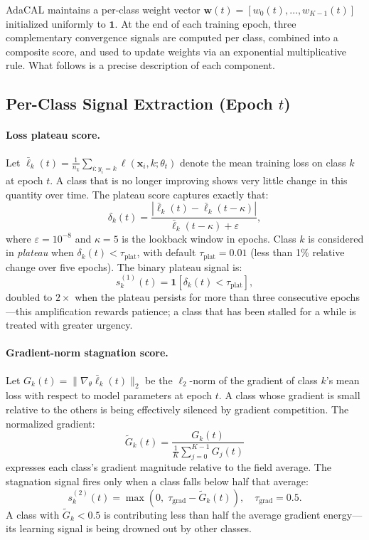 \documentclass[letterpaper]{article}
\begin{document}
AdaCAL maintains a per-class weight vector $\mathbf{w}(t) = [w_0(t), \ldots, w_{K-1}(t)]$ initialized uniformly to $\mathbf{1}$. At the end of each training epoch, three complementary convergence signals are computed per class, combined into a composite score, and used to update weights via an exponential multiplicative rule. What follows is a precise description of each component.

\subsection{Per-Class Signal Extraction (Epoch $t$)}

\paragraph{Loss plateau score.}
Let $\bar{\ell}_k(t) = \frac{1}{n_k} \sum_{i: y_i = k} \ell(\mathbf{x}_i, k; \theta_t)$ denote the mean training loss on class $k$ at epoch $t$. A class that is no longer improving shows very little change in this quantity over time. The plateau score captures exactly that:
$$\delta_k(t) = \frac{|\bar{\ell}_k(t) - \bar{\ell}_k(t - \kappa)|}{\bar{\ell}_k(t - \kappa) + \varepsilon},$$
where $\varepsilon = 10^{-8}$ and $\kappa = 5$ is the lookback window in epochs. Class $k$ is considered in \emph{plateau} when $\delta_k(t) < \tau_\text{plat}$, with default $\tau_\text{plat} = 0.01$ (less than 1\% relative change over five epochs). The binary plateau signal is:
$$s^{(1)}_k(t) = \mathbf{1}[\delta_k(t) < \tau_\text{plat}],$$
doubled to $2\times$ when the plateau persists for more than three consecutive epochs---this amplification rewards patience; a class that has been stalled for a while is treated with greater urgency.

\paragraph{Gradient-norm stagnation score.}
Let $G_k(t) = \|\nabla_\theta \bar{\ell}_k(t)\|_2$ be the $\ell_2$-norm of the gradient of class $k$'s mean loss with respect to model parameters at epoch $t$. A class whose gradient is small relative to the others is being effectively silenced by gradient competition. The normalized gradient:
$$\tilde{G}_k(t) = \frac{G_k(t)}{\frac{1}{K} \sum_{j=0}^{K-1} G_j(t)}$$
expresses each class's gradient magnitude relative to the field average. The stagnation signal fires only when a class falls below half that average:
$$s^{(2)}_k(t) = \max\!\left(0,\; \tau_\text{grad} - \tilde{G}_k(t)\right), \quad \tau_\text{grad} = 0.5.$$
A class with $\tilde{G}_k < 0.5$ is contributing less than half the average gradient energy---its learning signal is being drowned out by other classes.
\end{document}
